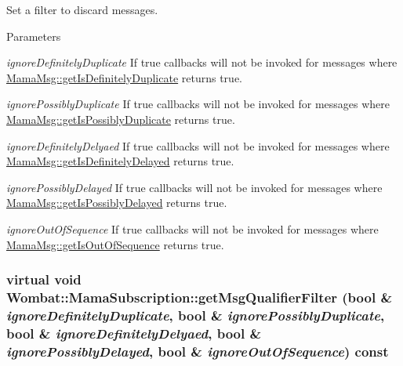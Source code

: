 Set a filter to discard messages. 
\begin{DoxyParams}{Parameters}
\item[{\em ignoreDefinitelyDuplicate}]If true callbacks will not be invoked for messages where \hyperlink{classWombat_1_1MamaMsg_aa29712e33dec9598f58d8b47d954a688}{MamaMsg::getIsDefinitelyDuplicate} returns true.\item[{\em ignorePossiblyDuplicate}]If true callbacks will not be invoked for messages where \hyperlink{classWombat_1_1MamaMsg_a3ac6ff5481827b2be803a43f1e5675e6}{MamaMsg::getIsPossiblyDuplicate} returns true.\item[{\em ignoreDefinitelyDelyaed}]If true callbacks will not be invoked for messages where \hyperlink{classWombat_1_1MamaMsg_a8fe32c62e0c88639c9e022337d4c7228}{MamaMsg::getIsDefinitelyDelayed} returns true.\item[{\em ignorePossiblyDelayed}]If true callbacks will not be invoked for messages where \hyperlink{classWombat_1_1MamaMsg_ad404a729cc7d7c213fd52e0235689d9e}{MamaMsg::getIsPossiblyDelayed} returns true.\item[{\em ignoreOutOfSequence}]If true callbacks will not be invoked for messages where \hyperlink{classWombat_1_1MamaMsg_a2b01886c287dd83c9b9a9aa20a9d9267}{MamaMsg::getIsOutOfSequence} returns true. \end{DoxyParams}
\hypertarget{classWombat_1_1MamaSubscription_acde88c025386448c58ee5db4393a08d6}{
\subsubsection[{getMsgQualifierFilter}]{\setlength{\rightskip}{0pt plus 5cm}virtual void Wombat::MamaSubscription::getMsgQualifierFilter (bool \& {\em ignoreDefinitelyDuplicate}, \/  bool \& {\em ignorePossiblyDuplicate}, \/  bool \& {\em ignoreDefinitelyDelyaed}, \/  bool \& {\em ignorePossiblyDelayed}, \/  bool \& {\em ignoreOutOfSequence}) const}}
\label{classWombat_1_1MamaSubscription_acde88c025386448c58ee5db4393a08d6}


